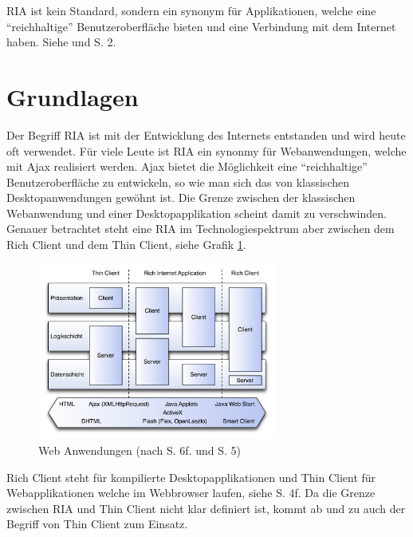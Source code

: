   \ac{RIA} ist kein Standard, sondern ein synonym für Applikationen, welche
  eine ``reichhaltige'' Benutzeroberfläche bieten und eine Verbindung mit dem
  Internet haben. Siehe \cite{RichInternetApplication} und
  \cite{RichInternetApplications} S. 2.
  
  \section{Grundlagen}
  
  Der Begriff \ac{RIA} ist mit der Entwicklung des Internets entstanden und
  wird heute oft verwendet. Für viele Leute ist \ac{RIA} ein synonmy für
  Webanwendungen, welche mit \ac{Ajax} realisiert werden. \ac{Ajax} bietet die
  Möglichkeit eine ``reichhaltige'' Benutzeroberfläche zu entwickeln, so wie
  man sich das von klassischen Desktopanwendungen gewöhnt ist. Die Grenze
  zwischen der klassischen Webanwendung und einer Desktopapplikation scheint
  damit zu verschwinden. Genauer betrachtet steht eine \ac{RIA} im
  Technologiespektrum aber zwischen dem Rich Client und dem Thin Client, siehe
  Grafik \ref{img:webanwendungen}.
  
  \begin{figure}[h]
    \begin{center}
      \includegraphics[width=0.7\textwidth]{./image/webanwendungen.png}
      \caption{Web Anwendungen (nach \cite{DiplomarbeitStephanSchuster} S. 6f.
      und \cite{WebApplicationSolutions} S. 5)}
      \label{img:webanwendungen}
    \end{center}
  \end{figure}
  
  Rich Client steht für kompilierte Desktopapplikationen und Thin Client für
  Webapplikationen welche im Webbrowser laufen, siehe
  \cite{WebApplicationSolutions} S. 4f. Da die Grenze zwischen \ac{RIA} und
  Thin Client nicht klar definiert ist, kommt ab und zu auch der Begriff von
  Thin Client zum Einsatz.
  
